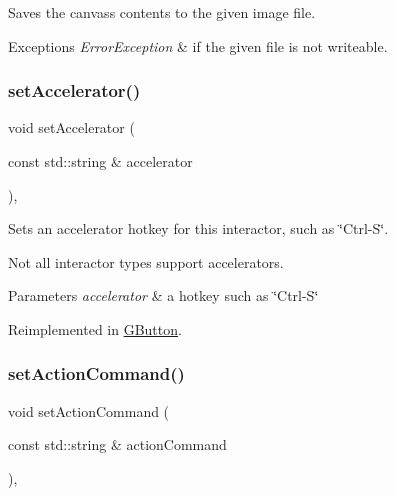 Saves the canvas\textquotesingle{}s contents to the given image file. 


\begin{DoxyExceptions}{Exceptions}
{\em Error\+Exception} & if the given file is not writeable. \\
\hline
\end{DoxyExceptions}
\mbox{\label{classGInteractor_ad15f102f62e2960576012f1aa0ba4b2e}} 
\subsubsection{\texorpdfstring{set\+Accelerator()}{setAccelerator()}}
{\footnotesize\ttfamily void set\+Accelerator (\begin{DoxyParamCaption}\item[{const std\+::string \&}]{accelerator }\end{DoxyParamCaption})\hspace{0.3cm}{\ttfamily [virtual]}, {\ttfamily [inherited]}}



Sets an accelerator hotkey for this interactor, such as \char`\"{}\+Ctrl-\/\+S\char`\"{}. 

Not all interactor types support accelerators. 
\begin{DoxyParams}{Parameters}
{\em accelerator} & a hotkey such as \char`\"{}\+Ctrl-\/\+S\char`\"{} \\
\hline
\end{DoxyParams}


Reimplemented in \mbox{\hyperlink{classGButton_a502f311e78e7531f8a7b50054ce91c85}{G\+Button}}.

\mbox{\label{classGInteractor_a4b5843fe3030e038a1ba54cc03389bcf}} 
\subsubsection{\texorpdfstring{set\+Action\+Command()}{setActionCommand()}}
{\footnotesize\ttfamily void set\+Action\+Command (\begin{DoxyParamCaption}\item[{const std\+::string \&}]{action\+Command }\end{DoxyParamCaption})\hspace{0.3cm}{\ttfamily [virtual]}, {\ttfamily [inherited]}}



